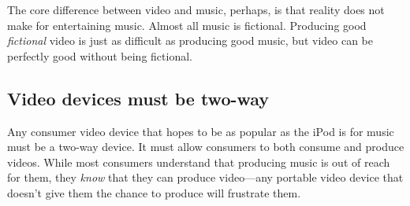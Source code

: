 \documentclass[12pt]{article}
\begin{document}
The core difference between video and music, perhaps, is that reality does not make for entertaining music.
Almost all music is fictional.
Producing good {\it fictional} video is just as difficult as producing good music, but video can be perfectly good without being fictional.   

\subsection{Video devices must be two-way}
Any consumer video device that hopes to be as popular as the iPod is for music must be a two-way device.
It must allow consumers to both consume and produce videos.
While most consumers understand that producing music is out of reach for them, they {\it know} that they can produce video---any portable video device that doesn't give them the chance to produce will frustrate them.
\end{document}
